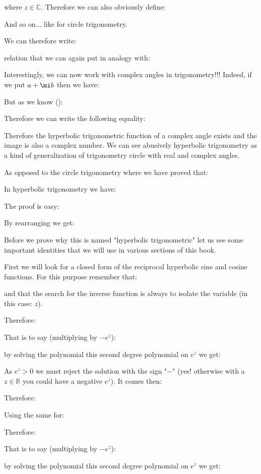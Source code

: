 	where $z \in \mathbb{C}$. Therefore we can also obviously define:
	
	And so on... like for circle trigonometry.

	We can therefore write:
	
	relation that we can again put in analogy with:
	
	Interestingly, we can now work with complex angles in trigonometry!!! Indeed, if we put $a+\mi b$ then we have:
	
	But as we know ():
	
	Therefore we can write the following equality:
	
	Therefore the hyperbolic trigonometric function of a complex angle exists and the image is also a complex number. We can see abusively hyperbolic trigonometry as a kind of generalization of trigonometry circle with real and complex angles.
	
	As opposed to the circle trigonometry where we have proved that:
	
	In hyperbolic trigonometry we have:
	
	The proof is easy:
	
	By rearranging we get:
	
	Before we prove why this is named "hyperbolic trigonometric" let us see some important identities that we will use in various sections of this book.
	
	First we will look for a closed form of the reciprocal hyperbolic sine and cosine functions. For this purpose remember that:
	
	and that the search for the inverse function is always to isolate the variable (in this case: $z$).
	
	Therefore:
	
	That is to say (multiplying by $-e^z$):
	
	by solving the polynomial this second degree polynomial on $e^{z}$ we get:
	
	As $e^{z}>0$ we must reject the solution with the sign "$-$" (yes! otherwise with a $z \in \mathbb{R}$ you could have a negative $e^z$). It comes then:
	
	Therefore:
	
	Using the same for:
	
	Therefore:
	
	That is to say (multiplying by $-e^z$):
	
	by solving the polynomial this second degree polynomial on $e^{z}$ we get:
	
